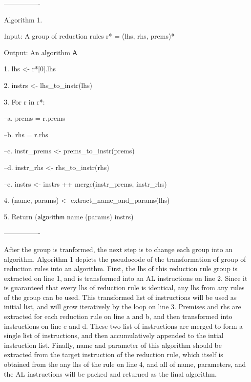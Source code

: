 ----------------

Algorithm 1.

Input: A group of reduction rules r* = (lhs, rhs, prems)*

Output: An algorithm $\mathsf{A}$

1. lhs <- r*[0].lhs

2. instrs <- lhs\_to\_instr(lhs)

3. For r in r*:

--a. prems = r.prems

--b. rhs = r.rhs

--c. instr\_prems <- prems\_to\_instr(prems)

--d. instr\_rhs <- rhs\_to\_instr(rhs)

--e. instrs <- instrs ++ merge(instr\_prems, instr\_rhs)

4. (name, params) <- extract\_name\_and\_params(lhs)

5. Return ($\mathsf{algorithm}$ name (params) {instrs})

----------------



After the group is tranformed, the next step is to
change each group into an algorithm. Algorithm 1 depicts the pseudocode of the transformation
of group of reduction rules into an algorithm.
First, the lhs of this reduction rule group is extracted on line 1, and is transformed into
an AL instructions on line 2. Since it is guaranteed that every lhs of reduction rule is
identical, any lhs from any rules of the group can be used. This transformed list of instructions
will be used as initial list, and will grow iteratively by the loop on line 3.
Premises and rhs are extracted for each reduction rule on line a and b, and then transformed into
instructions on line c and d. These two list of instructions are merged to form a single
list of instructions, and then accumulatively appended to the intial instruction list.
Finally, name and parameter of this algorithm should be extracted from the target instruction of the reduction rule,
which itself is obtained from the any lhs of the rule on line 4, and all of name, parameters, and the
AL instructions will be packed and returned as the final algorithm.


